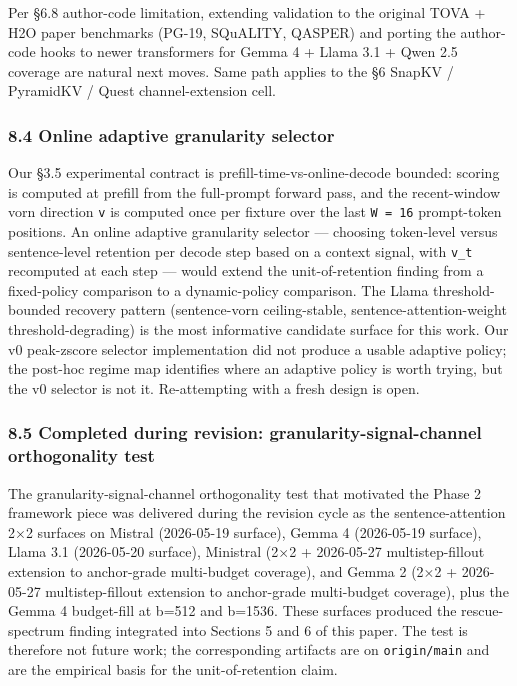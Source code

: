 \documentclass[
]{article}
\begin{document}
Per §6.8 author-code limitation, extending validation to the original
TOVA + H2O paper benchmarks (PG-19, SQuALITY, QASPER) and porting the
author-code hooks to newer transformers for Gemma 4 + Llama 3.1 + Qwen
2.5 coverage are natural next moves. Same path applies to the §6
SnapKV / PyramidKV / Quest channel-extension cell.

\subsubsection{8.4 Online adaptive granularity
selector}\label{84-online-adaptive-granularity-selector}

Our §3.5 experimental contract is prefill-time-vs-online-decode bounded:
scoring is computed at prefill from the full-prompt forward pass, and
the recent-window vorn direction \texttt{v} is computed once per fixture
over the last \texttt{W\ =\ 16} prompt-token positions. An online
adaptive granularity selector --- choosing token-level versus
sentence-level retention per decode step based on a context signal, with
\texttt{v\_t} recomputed at each step --- would extend the
unit-of-retention finding from a fixed-policy comparison to a
dynamic-policy comparison. The Llama threshold-bounded recovery pattern
(sentence-vorn ceiling-stable, sentence-attention-weight
threshold-degrading) is the most informative candidate surface for this
work. Our v0 peak-zscore selector implementation did not produce a
usable adaptive policy; the post-hoc regime map identifies where an
adaptive policy is worth trying, but the v0 selector is not it.
Re-attempting with a fresh design is open.

\subsubsection{8.5 Completed during revision: granularity-signal-channel
orthogonality
test}\label{85-completed-during-revision-granularity-signal-channel-orthogonality-test}

The granularity-signal-channel orthogonality test that motivated the
Phase 2 framework piece was delivered during the revision cycle as the
sentence-attention 2×2 surfaces on Mistral (2026-05-19 surface), Gemma 4
(2026-05-19 surface), Llama 3.1 (2026-05-20 surface), Ministral
(2$\times$2 + 2026-05-27 multistep-fillout extension to anchor-grade
multi-budget coverage), and Gemma 2 (2$\times$2 + 2026-05-27
multistep-fillout extension to anchor-grade multi-budget coverage),
plus the Gemma 4 budget-fill at b=512 and b=1536. These surfaces
produced the rescue-spectrum finding integrated into Sections 5 and 6 of
this paper. The test is therefore not future work; the corresponding
artifacts are on \texttt{origin/main} and are the empirical basis for
the unit-of-retention claim.
\end{document}
